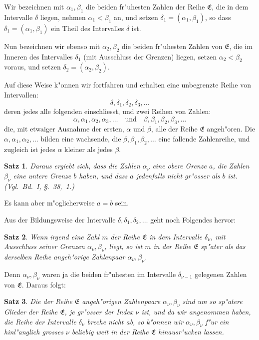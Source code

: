 \documentclass[10pt,a4paper]{article}
\theoremstyle{weberstyle}
\newtheorem{satz}{Satz}[section]
\begin{document}
Wir bezeichnen mit $\alpha_1,\beta_1$ die beiden fr"uhesten Zahlen der Reihe
$\mathfrak{E}$, die in dem Intervalle $\delta$ liegen, nehmen
$\alpha_1<\beta_1$ an, und setzen $\delta_1=(\alpha_1,\beta_1)$, so dass
$\delta_1=(\alpha_1,\beta_1)$ ein Theil des Intervalles $\delta$ ist.

Nun bezeichnen wir ebenso mit $\alpha_2,\beta_2$ die beiden fr"uhesten
Zahlen von $\mathfrak{E}$, die im Inneren des Intervalles $\delta_1$ (mit
Ausschluss der Grenzen) liegen, setzen $\alpha_2<\beta_2$ voraus, und setzen
$\delta_2=(\alpha_2,\beta_2)$.

Auf diese Weise k"onnen wir fortfahren und erhalten eine unbegrenzte Reihe
von Intervallen:
\[
\delta,\delta_1,\delta_2,\delta_3,\dots
\]
deren jedes alle folgenden einschliesst, und zwei Reihen von Zahlen:
\[
\alpha,\alpha_1,\alpha_2,\alpha_3,\dots\quad\text{und}\quad
\beta,\beta_1,\beta_2,\beta_3,\dots
\]
die, mit etwaiger Ausnahme der ersten, $\alpha$ und $\beta$, alle der Reihe
$\mathfrak{E}$ angeh"oren. Die $\alpha,\alpha_1,\alpha_2,\dots$ bilden eine
wachsende, die $\beta,\beta_1,\beta_2,\dots$ eine fallende Zahlenreihe, und
zugleich ist jedes $\alpha$ kleiner als jedes $\beta$.

\begin{satz}
Daraus ergiebt sich, dass die Zahlen $\alpha_\nu$ eine obere Grenze $a$,
die Zahlen $\beta_\nu$ eine untere Grenze $b$ haben, und dass $a$
jedenfalls nicht gr"osser als $b$ ist. (Vgl.~Bd.~I, \S.~38,~1.)
\end{satz}

Es kann aber m"oglicherweise $a=b$ sein.

Aus der Bildungsweise der Intervalle $\delta,\delta_1,\delta_2,\dots$ geht noch
Folgendes hervor:

\begin{satz}
Wenn irgend eine Zahl $m$ der Reihe $\mathfrak{E}$ in dem Intervalle
$\delta_\nu$, mit Ausschluss seiner Grenzen $\alpha_\nu,\beta_\nu$, liegt, so ist
$m$ in der Reihe $\mathfrak{E}$ sp"ater als das derselben Reihe angeh"orige
Zahlenpaar $\alpha_\nu,\beta_\nu$.
\end{satz}

Denn $\alpha_\nu,\beta_\nu$ waren ja die beiden fr"uhesten im Intervalle
$\delta_{\nu-1}$ gelegenen Zahlen von $\mathfrak{E}$. Daraus folgt:

\begin{satz}
Die der Reihe $\mathfrak{E}$ angeh"origen Zahlenpaare $\alpha_\nu,\beta_\nu$ sind
um so sp"atere Glieder der Reihe $\mathfrak{E}$, je gr"osser der Index $\nu$
ist, und da wir angenommen haben, die Reihe der Intervalle $\delta_\nu$
breche nicht ab, so k"onnen wir $\alpha_\nu,\beta_\nu$ f"ur ein hinl"anglich
grosses $\nu$ beliebig weit in der Reihe $\mathfrak{E}$ hinausr"ucken lassen.
\end{satz}
\end{document}
